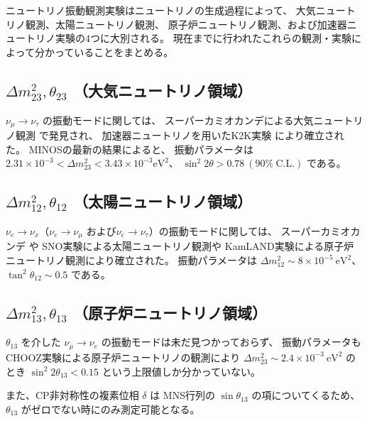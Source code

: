 ニュートリノ振動観測実験はニュートリノの生成過程によって、
大気ニュートリノ観測、太陽ニュートリノ観測、
原子炉ニュートリノ観測、および加速器ニュートリノ実験の4つに大別される。
現在までに行われたこれらの観測・実験によって分かっていることをまとめる。


\subsection{$\Delta m_{23}^{2}, \theta_{23}$ （大気ニュートリノ領域）}

$\nu_{\mu} \rightarrow \nu_{\tau}$ の振動モードに関しては、
スーパーカミオカンデによる大気ニュートリノ観測 \cite{sk_solar} で発見され、
加速器ニュートリノを用いたK2K実験 \cite{k2k} により確立された。
MINOSの最新の結果\cite{minos}によると、
振動パラメータは
$2.31 \times 10^{-3} < \Delta m_{23}^{2} < 3.43 \times 10^{-3} \mathrm{eV^{2}}$、
$\sin^{2} 2 \theta > 0.78\ (90 \%\ \mathrm{C.L.})$ である。

\subsection{$\Delta m_{12}^{2}, \theta_{12}$ （太陽ニュートリノ領域）}

$\nu_{e} \rightarrow \nu_{x}$（$\nu_{e} \rightarrow \nu_{\mu}$
および$\nu_{e} \rightarrow \nu_{\tau}$）の振動モードに関しては、
スーパーカミオカンデ \cite{sk-solar}や SNO実験\cite{sno}による太陽ニュートリノ観測や
KamLAND実験\cite{kamland}による原子炉ニュートリノ観測により確立された。
振動パラメータは
$\Delta m_{12}^{2} \sim 8 \times 10^{-5}\ \mathrm{eV^{2}}$、
$\tan^{2}\theta_{12} \sim 0.5$ である。

\subsection{$\Delta m_{13}^{2}, \theta_{13}$ （原子炉ニュートリノ領域）}

$\theta_{13}$ を介した
$\nu_{\mu} \rightarrow \nu_{e}$ の振動モードは未だ見つかっておらず、
振動パラメータもCHOOZ実験による原子炉ニュートリノの観測\cite{chooz}により
$\Delta m_{23}^{2} \sim 2.4 \times 10^{-3}\ \mathrm{eV^{2}}$ のとき
$\sin^{2} 2 \theta_{13} < 0.15$ という上限値しか分かっていない。

また、CP非対称性の複素位相 $\delta$ は
MNS行列の $\sin \theta_{13}$ の項についてくるため、
$\theta_{13}$ がゼロでない時にのみ測定可能となる。
